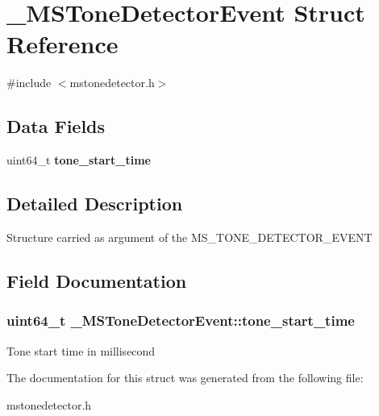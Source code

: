 \section{\-\_\-\-M\-S\-Tone\-Detector\-Event Struct Reference}
\label{struct__MSToneDetectorEvent}


{\ttfamily \#include $<$mstonedetector.\-h$>$}

\subsection*{Data Fields}
\begin{DoxyCompactItemize}
\item 
uint64\-\_\-t {\bf tone\-\_\-start\-\_\-time}
\end{DoxyCompactItemize}


\subsection{Detailed Description}
Structure carried as argument of the M\-S\-\_\-\-T\-O\-N\-E\-\_\-\-D\-E\-T\-E\-C\-T\-O\-R\-\_\-\-E\-V\-E\-N\-T 

\subsection{Field Documentation}
\subsubsection[{tone\-\_\-start\-\_\-time}]{\setlength{\rightskip}{0pt plus 5cm}uint64\-\_\-t \-\_\-\-M\-S\-Tone\-Detector\-Event\-::tone\-\_\-start\-\_\-time}\label{struct__MSToneDetectorEvent_a535cb13b07856d22a925a5f87c87b4e4}
Tone start time in millisecond 

The documentation for this struct was generated from the following file\-:\begin{DoxyCompactItemize}
\item 
mstonedetector.\-h\end{DoxyCompactItemize}
